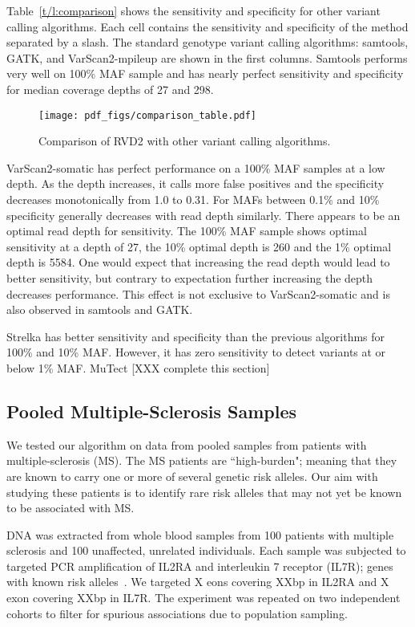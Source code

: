 \documentclass[11pt,reqno]{amsart}
\begin{document}
Table~\ref{t/l:comparison} shows the sensitivity and specificity for other variant calling algorithms. Each cell contains the sensitivity and specificity of the method separated by a slash. The standard genotype variant calling algorithms: samtools, GATK, and VarScan2-mpileup are shown in the first columns. Samtools performs very well on 100\% MAF sample and has nearly perfect sensitivity and specificity for median coverage depths of 27 and 298. 

\begin{figure}[h]
\begin{center}
\texttt{[image: pdf\_figs/comparison\_table.pdf]}
\caption{Comparison of RVD2 with other variant calling algorithms.}
\label{fig:comparison}
\end{center}
\end{figure}

VarScan2-somatic has perfect performance on a 100\% MAF samples at a low depth. As the depth increases, it calls more false positives and the specificity decreases monotonically from 1.0 to 0.31. For MAFs between 0.1\% and 10\% specificity generally decreases with read depth similarly. There appears to be an optimal read depth for sensitivity. The 100\% MAF sample shows optimal sensitivity at a depth of 27, the 10\% optimal depth is 260 and the 1\% optimal depth is 5584. One would expect that increasing the read depth would lead to better sensitivity, but contrary to expectation further increasing the depth decreases performance. This effect is not exclusive to VarScan2-somatic and is also observed in samtools and GATK.

Strelka has better sensitivity and specificity than the previous algorithms for 100\% and 10\% MAF. However, it has zero sensitivity to detect variants at or below 1\% MAF. MuTect [XXX complete this section]

\subsection{Pooled Multiple-Sclerosis Samples}

We tested our algorithm on data from pooled samples from patients with multiple-sclerosis (MS). The MS patients are ``high-burden"; meaning that they are known to carry one or more of several genetic risk alleles. Our aim with studying these patients is to identify rare risk alleles that may not yet be known to be associated with MS. 

DNA was extracted from whole blood samples from 100 patients with multiple sclerosis and 100 unaffected, unrelated individuals. Each sample was subjected to targeted PCR amplification of IL2RA and interleukin 7 receptor (IL7R); genes with known risk alleles~\cite{HauserNEJM2007}. We targeted X eons covering XXbp in IL2RA and X exon covering XXbp in IL7R. The experiment was repeated on two independent cohorts to filter for spurious associations due to population sampling.
\end{document}
